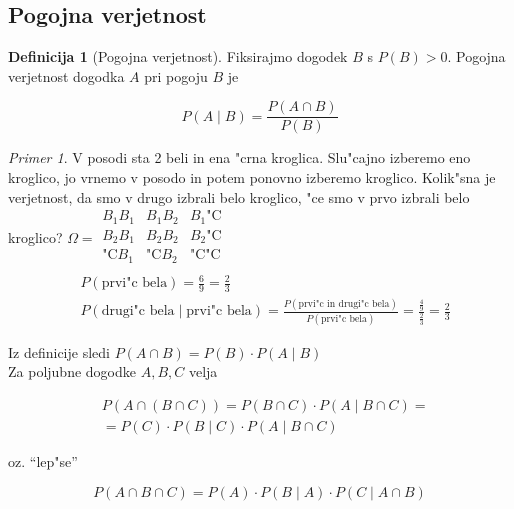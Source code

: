 \documentclass[a4paper,12pt]{article}
\theoremstyle{definition}
\newtheorem{defn}[counter]{Definicija}
\theoremstyle{remark}
\newtheorem*{ex}{Primer}
\begin{document}
\subsection{Pogojna verjetnost}

\begin{defn}[Pogojna verjetnost]
    Fiksirajmo dogodek $B$ s $P(B) > 0$. Pogojna verjetnost dogodka $A$ pri pogoju $B$ je

    \begin{equation*}
        P(A \mid B) = \frac{P(A \cap B)}{P(B)}
    \end{equation*}
\end{defn}

\begin{ex}
    V posodi sta 2 beli in ena "crna kroglica. Slu"cajno izberemo eno kroglico, jo vrnemo v posodo in potem ponovno
    izberemo kroglico. Kolik"sna je verjetnost, da smo v drugo izbrali belo kroglico, "ce smo v prvo izbrali belo
    kroglico?
    $\Omega = \begin{matrix}
        B_1B_1 & B_1B_2 & B_1\text{"C} \\
        B_2B_1 & B_2B_2 & B_2\text{"C} \\
        \text{"C}B_1 & \text{"C}B_2 & \text{"C"C} \\
    \end{matrix}$ \\
    \begin{align*}
        &P(\text{prvi"c bela}) = \frac{6}{9} = \frac{2}{3} \\
        &P(\text{drugi"c bela} \mid \text{prvi"c bela}) = \frac{P(\text{prvi"c in drugi"c bela})}{P(\text{prvi"c bela})}
            = \frac{\frac{4}{9}}{\frac{2}{3}} = \frac{2}{3}
    \end{align*}
\end{ex}

Iz definicije sledi $P(A \cap B) = P(B) \cdot P(A \mid B)$ \\
Za poljubne dogodke $A, B, C$ velja

\begin{align*}
    &P(A \cap (B \cap C)) = P(B \cap C) \cdot P(A \mid B \cap C) = \\
    &= P(C) \cdot P(B \mid C) \cdot P(A \mid B \cap C)
\end{align*}

oz. ``lep"se''

\begin{equation*}
    P(A \cap B \cap C) = P(A) \cdot P(B \mid A) \cdot P(C \mid A \cap B)
\end{equation*}
\end{document}
